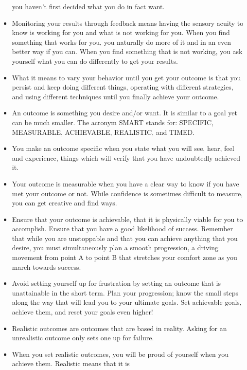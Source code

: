 \begin{itemize}
        you haven’t first decided what you do in fact want.
        \item Monitoring your results through feedback means having the sensory acuity to know is working for
        you and what is not working for you. When you find something that works for you, you naturally do
        more of it and in an even better way if you can. When you find something that is not working, you
        ask yourself what you can do differently to get your results.
        \item What it means to vary your behavior until you get your outcome is that you persist and keep doing
        different things, operating with different strategies, and using different techniques until you finally
        achieve your outcome.
        \item An outcome is something you desire and/or want. It is
        similar to a goal yet can be much smaller. The acronym
        SMART stands for: SPECIFIC, MEASURABLE, ACHIEVABLE, REALISTIC, and TIMED.
        \item You make an outcome specific when you state what you will see, hear, feel and experience, things
        which will verify that you have undoubtedly achieved it.
        \item Your outcome is measurable when you have a clear way to know if you have met your outcome or
        not. While confidence is sometimes difficult to measure, you can get
        creative and find ways.
        \item Ensure that your outcome is achievable, that it is physically viable for you to accomplish. Ensure
        that you have a good likelihood of success. Remember that while you are unstoppable and that you can achieve anything that you desire, you must simultaneously plan a smooth progression, a driving
        movement from point A to point B that stretches your comfort zone as you march towards success.
        \item Avoid setting yourself up for frustration by setting an outcome that is unattainable in the short term.
        Plan your progression; know the small steps along the way that will lead you to your ultimate goals.
        Set achievable goals, achieve them, and reset your goals even higher!
        \item Realistic outcomes are outcomes that are based in reality. Asking for an unrealistic outcome only sets one up for failure.
        \item When you set
        realistic outcomes, you will be proud of yourself when you achieve them. Realistic means that it is

\end{itemize}
